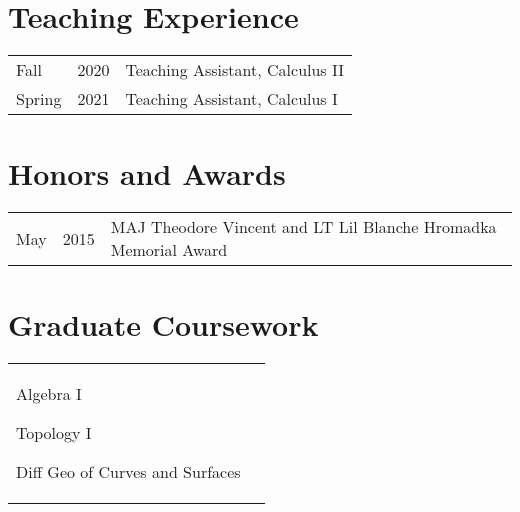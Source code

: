 \documentclass[margin,line,pifont,palatino,courier]{res}
\newenvironment{list1}{
  \begin{list}{\ding{113}}{%
      \setlength{\itemsep}{0in}
      \setlength{\parsep}{0in} \setlength{\parskip}{0in}
      \setlength{\topsep}{0in} \setlength{\partopsep}{0in}
      \setlength{\leftmargin}{0.17in}}}{\end{list}}
\begin{document}
\begin{resume}


\section{\sc Teaching Experience}

\begin{tabular}{@{}p{0.4in}p{0.3in}p{4in}}
Fall & 2020 & Teaching Assistant, Calculus II\\
Spring & 2021 & Teaching Assistant, Calculus I\\
\end{tabular}



\section{\sc Honors and Awards}

\begin{tabular}{@{}p{0.4in}p{0.3in}p{4in}}
May & 2015 & MAJ Theodore Vincent and LT Lil Blanche Hromadka Memorial Award\\
\end{tabular}







\section{\sc Graduate Coursework}

\begin{tabular}{@{}p{2.3in}p{3in}}
  \begin{list1}
  \item Algebra I
  \item Topology I
  \item Diff Geo of Curves and Surfaces


\end{list1}
\end{tabular}
\end{resume}
\end{document}
